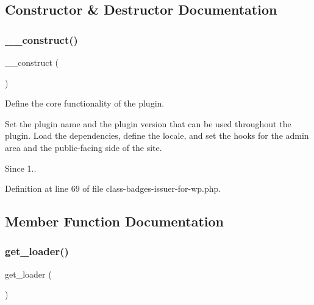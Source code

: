 \subsection{Constructor \& Destructor Documentation}
\mbox{\label{class_badges___issuer___for___wp_a095c5d389db211932136b53f25f39685}} 
\subsubsection{\texorpdfstring{\+\_\+\+\_\+construct()}{\_\_construct()}}
{\footnotesize\ttfamily \+\_\+\+\_\+construct (\begin{DoxyParamCaption}{ }\end{DoxyParamCaption})}

Define the core functionality of the plugin.

Set the plugin name and the plugin version that can be used throughout the plugin. Load the dependencies, define the locale, and set the hooks for the admin area and the public-\/facing side of the site.

\begin{DoxySince}{Since}
1.. 
\end{DoxySince}


Definition at line 69 of file class-\/badges-\/issuer-\/for-\/wp.\+php.



\subsection{Member Function Documentation}
\mbox{\label{class_badges___issuer___for___wp_a73bc2ecc211930c4a1f8b9385c8004d5}} 
\subsubsection{\texorpdfstring{get\+\_\+loader()}{get\_loader()}}
{\footnotesize\ttfamily get\+\_\+loader (\begin{DoxyParamCaption}{ }\end{DoxyParamCaption})}

